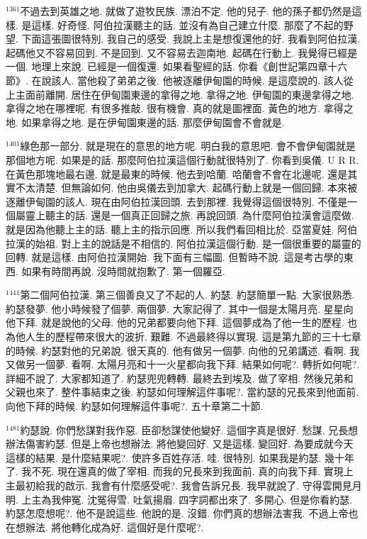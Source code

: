\documentclass{book}
\begin{document}
$^{1361}$不過去到英雄之地.
就做了遊牧民族.
漂泊不定.
他的兒子.
他的孫子都仍然是這樣.
是這樣.
好奇怪.
阿伯拉漢聽主的話.
並沒有為自己建立什麼.
那麼了不起的野望.
下面這張圖很特別.
我自己的感受.
我說上主是想復還他的好.
我看到阿伯拉漢.
起碼他又不容易回到.
不是回到.
又不容易去迦南地.
起碼在行動上.
我覺得已經是一個.
地理上來說.
已經是一個復還.
如果看聖經的話.
你看《創世記第四章十六節》.
在說該人.
當他殺了弟弟之後.
他被逐離伊甸園的時候.
是這麼說的.
該人從上主面前離開.
居住在伊甸園東邊的拿得之地.
拿得之地.
伊甸園的東邊拿得之地.
拿得之地在哪裡呢.
有很多推敲.
很有機會.
真的就是圖裡面.
黃色的地方.
拿得之地.
如果拿得之地.
是在伊甸園東邊的話.
那麼伊甸園會不會就是.

$^{1401}$綠色那一部分.
就是現在的意思的地方呢.
明白我的意思吧.
會不會伊甸園就是那個地方呢.
如果是的話.
那麼阿伯拉漢這個行動就很特別了.
你看到吳儀.
U R R.
在黃色那塊地最右邊.
就是最東的時候.
他去到哈蘭.
哈蘭會不會在北邊呢.
還是其實不太清楚.
但無論如何.
他由吳儀去到加拿大.
起碼行動上就是一個回歸.
本來被逐離伊甸園的該人.
現在由阿伯拉漢回頭.
去到那裡.
我覺得這個很特別.
不僅是一個屬靈上聽主的話.
還是一個真正回歸之旅.
再說回頭.
為什麼阿伯拉漢會這麼做.
就是因為他聽上主的話.
聽上主的指示回應.
所以我們看回相比於.
亞當夏娃.
阿伯拉漢的始祖.
對上主的說話是不相信的.
阿伯拉漢這個行動.
是一個很重要的屬靈的回轉.
就是這樣.
由阿伯拉漢開始.
我下面有三幅圖.
但暫時不說.
這是考古學的東西.
如果有時間再說.
沒時間就抱歉了.
第一個羅亞.

$^{1441}$第二個阿伯拉漢.
第三個善良又了不起的人.
約瑟.
約瑟簡單一點.
大家很熟悉.
約瑟發夢.
他小時候發了個夢.
兩個夢.
大家記得了.
其中一個是太陽月亮.
星星向他下拜.
就是說他的父母.
他的兄弟都要向他下拜.
這個夢成為了他一生的歷程.
也為他人生的歷程帶來很大的波折.
艱難.
不過最終得以實現.
這是第九節的三十七章的時候.
約瑟對他的兄弟說.
很天真的.
他有做另一個夢.
向他的兄弟講述.
看啊.
我又做另一個夢.
看啊.
太陽月亮和十一火星都向我下拜.
結果如何呢?.
轉折如何呢?.
詳細不說了.
大家都知道了.
約瑟兜兜轉轉.
最終去到埃及.
做了宰相.
然後兄弟和父親也來了.
整件事結束之後.
約瑟如何理解這件事呢?.
當約瑟的兄長來到他面前.
向他下拜的時候.
約瑟如何理解這件事呢?.
五十章第二十節.

$^{1481}$約瑟說.
你們愁謀對我作惡.
臣卻愁謀使他變好.
這個字真是很好.
愁謀.
兄長想辦法傷害約瑟.
但是上帝也想辦法.
將他變回好.
又是這樣.
變回好.
為要成就今天這樣的結果.
是什麼結果呢?.
使許多百姓存活.
哇.
很特別.
如果我是約瑟.
幾十年了.
我不死.
現在還真的做了宰相.
而我的兄長來到我面前.
真的向我下拜.
實現上主最初給我的啟示.
我會有什麼感受呢?.
我會告訴兄長.
我早就說了.
守得雲開見月明.
上主為我伸冤.
沈冤得雪.
吐氣揚眉.
四字詞都出來了.
多開心.
但是你看約瑟.
約瑟怎麼想呢?.
他不是說這些.
他說的是.
沒錯.
你們真的想辦法害我.
不過上帝也在想辦法.
將他轉化成為好.
這個好是什麼呢?.
\end{document}
